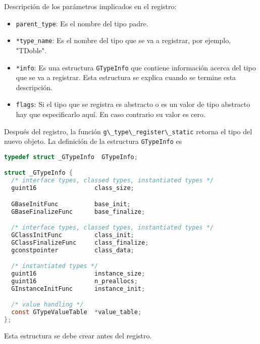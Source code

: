 Descripción de los parámetros implicados en el registro:
\begin{itemize}
  \tightlist
\item \texttt{parent\_type}: Es el nombre del tipo padre.
\item \texttt{*type\_name}: Es el nombre del tipo que se va a registrar,
  por ejemplo, "\textsf{TDoble}".
\item \texttt{*info}: Es una estructura \texttt{GTypeInfo} que contiene información acerca
  del tipo que se va a registrar. Esta estructura se explica cuando se termine esta
  descripción.
\item \texttt{flags}: Si el tipo que se registra es abstracto o es un valor de tipo
  abstracto\footnotemark{} hay que especificarlo aquí. En caso contrario su valor es cero.
\end{itemize}
Después del registro, la función \passthrough{\lstinline!g\_type\_register\_static!} retorna
el tipo del nuevo objeto. La definición de la estructura \texttt{GTypeInfo} es
\begin{lstlisting}[language=C]
typedef struct _GTypeInfo  GTypeInfo;

struct _GTypeInfo {
  /* interface types, classed types, instantiated types */
  guint16                class_size;

  GBaseInitFunc          base_init;
  GBaseFinalizeFunc      base_finalize;

  /* interface types, classed types, instantiated types */
  GClassInitFunc         class_init;
  GClassFinalizeFunc     class_finalize;
  gconstpointer          class_data;

  /* instantiated types */
  guint16                instance_size;
  guint16                n_preallocs;
  GInstanceInitFunc      instance_init;

  /* value handling */
  const GTypeValueTable  *value_table;
};
\end{lstlisting}

Esta estructura se debe crear antes del registro.

